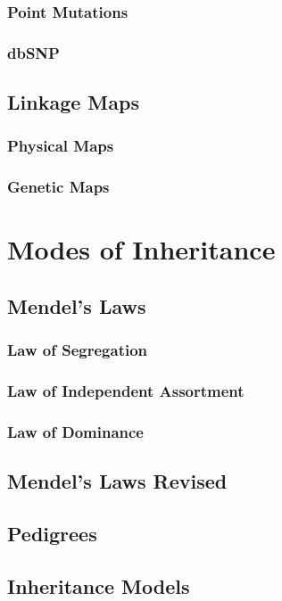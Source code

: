 \subsubsection{Point Mutations}
\subsubsection{dbSNP}

\subsection{Linkage Maps}
\subsubsection{Physical Maps}
\subsubsection{Genetic Maps}


\section{Modes of Inheritance}

\subsection{Mendel's Laws}
\subsubsection{Law of Segregation}
\subsubsection{Law of Independent Assortment}
\subsubsection{Law of Dominance}

\subsection{Mendel's Laws Revised}
\subsection{Pedigrees}

\subsection{Inheritance Models}
